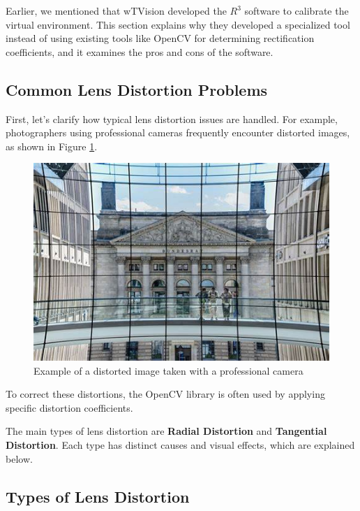 \noindent Earlier, we mentioned that wTVision developed the $R^3$ software to calibrate the virtual environment. This section explains why they developed a specialized tool instead of using existing tools like OpenCV for determining rectification coefficients, and it examines the pros and cons of the software.

\subsection{Common Lens Distortion Problems}

\noindent First, let’s clarify how typical lens distortion issues are handled. For example, photographers using professional cameras frequently encounter distorted images, as shown in Figure \ref{fig:prof_camera}.

\begin{figure}[h]
    \centering
    \includegraphics[width=\textwidth]{Images/02stateart/professional camera.png}
    \caption{Example of a distorted image taken with a professional camera}
    \label{fig:prof_camera}
\end{figure}

\noindent To correct these distortions, the OpenCV library is often used by applying specific distortion coefficients.

\noindent The main types of lens distortion are \textbf{Radial Distortion} and \textbf{Tangential Distortion}. Each type has distinct causes and visual effects, which are explained below.

\subsection{Types of Lens Distortion}


